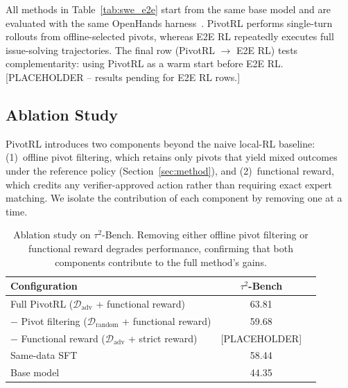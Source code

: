 All methods in Table~\ref{tab:swe_e2e} start from the same base model and are evaluated with the same OpenHands harness~\citep{wang2025openhandsopenplatformai}. PivotRL performs single-turn rollouts from offline-selected pivots, whereas E2E RL repeatedly executes full issue-solving trajectories. The final row (PivotRL $\to$ E2E RL) tests complementarity: using PivotRL as a warm start before E2E RL. [PLACEHOLDER -- results pending for E2E RL rows.]
 
\subsection{Ablation Study}
\label{sec:ablation_study}
 
PivotRL introduces two components beyond the naive local-RL baseline: (1)~offline pivot filtering, which retains only pivots that yield mixed outcomes under the reference policy (Section~\ref{sec:method}), and (2)~functional reward, which credits any verifier-approved action rather than requiring exact expert matching. We isolate the contribution of each component by removing one at a time.
 
\begin{table}[t]
\centering
\small
\begin{tabular}{lcc}
\toprule
\textbf{Configuration} & \textbf{$\tau^2$-Bench} \\
\midrule
Full PivotRL ($\mathcal{D}_{\mathrm{adv}}$ + functional reward) & 63.81 \\
\quad $-$ Pivot filtering ($\mathcal{D}_{\mathrm{random}}$ + functional reward) & 59.68 \\
\quad $-$ Functional reward ($\mathcal{D}_{\mathrm{adv}}$ + strict reward) & [PLACEHOLDER] \\
\midrule
Same-data SFT & 58.44 \\
Base model & 44.35 \\
\bottomrule
\end{tabular}
\caption{
Ablation study on $\tau^2$-Bench. Removing either offline pivot filtering or functional reward degrades performance, confirming that both components contribute to the full method's gains.
}
\label{tab:ablation_main}
\end{table}
 
